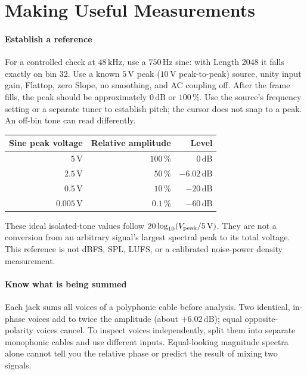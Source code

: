 \section{Making Useful Measurements}\label{sec:measurements}

\paragraph{Establish a reference}
For a controlled check at $48\,\mathrm{kHz}$, use a $750\,\mathrm{Hz}$ sine:
with Length 2048 it falls exactly on bin 32. Use a known $5\,\mathrm{V}$
peak ($10\,\mathrm{V}$ peak-to-peak) source, unity input gain, Flattop,
zero Slope, no smoothing, and AC coupling off. After the frame fills,
the peak should be approximately $0\,\mathrm{dB}$ or $100\,\%$.
Use the source's frequency setting or a separate tuner to establish pitch;
the cursor does not snap to a peak. An off-bin tone can read differently.

\begin{center}
\renewcommand{\arraystretch}{1.25}
\begin{tabular}{@{}rrr@{}}
\toprule
\textbf{Sine peak voltage} & \textbf{Relative amplitude} & \textbf{Level} \\
\midrule
$5\,\mathrm{V}$ & $100\,\%$ & $0\,\mathrm{dB}$ \\
$2.5\,\mathrm{V}$ & $50\,\%$ & $-6.02\,\mathrm{dB}$ \\
$0.5\,\mathrm{V}$ & $10\,\%$ & $-20\,\mathrm{dB}$ \\
$0.005\,\mathrm{V}$ & $0.1\,\%$ & $-60\,\mathrm{dB}$ \\
\bottomrule
\end{tabular}
\end{center}

These ideal isolated-tone values follow $20\log_{10}(V_{\rm peak}/5\,\mathrm{V})$.
They are not a conversion from an arbitrary signal's largest spectral peak
to its total voltage. This reference is not dBFS, SPL, LUFS, or a calibrated
noise-power density measurement.

\paragraph{Know what is being summed}
Each jack sums all voices of a polyphonic cable before analysis. Two identical,
in-phase voices add to twice the amplitude (about $+6.02\,\mathrm{dB}$);
equal opposite-polarity voices cancel. To inspect voices independently, split
them into separate monophonic cables and use different inputs. Equal-looking
magnitude spectra alone cannot tell you the relative phase or predict the
result of mixing two signals.

